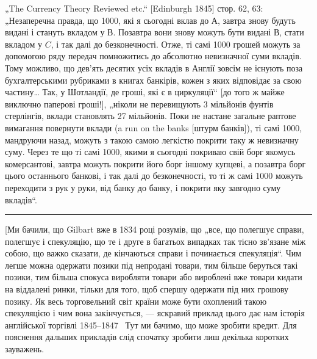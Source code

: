 „The Currency Theory Reviewed etc.“ [Edinburgh 1845] стор. 62, 63: „Незаперечна правда, що 1000, які я сьогодні вклав до $А$, завтра
знову будуть видані і стануть вкладом у $В$. Позавтра вони знову можуть бути
видані $В$, стати вкладом у $C$, і так далі до безконечності. Отже, ті самі
1000 грошей можуть за допомогою ряду передач помножитись до абсолютно невизначної
суми вкладів. Тому можливо, що дев’ять десятих усіх вкладів в Англії зовсім не існують поза
бухгалтерськими рубриками
в книгах банкірів, кожен з яких відповідає за свою частину\dots{} Так, у Шотландії, де гроші, які є в
циркуляції“ [до того ж майже виключно паперові гроші!],
„ніколи не перевищують 3 мільйонів фунтів стерлінгів, вклади становлять 27 мільйонів.
Поки не настане загальне раптове вимагання повернути вклади (a run
on the banks [штурм банків]), ті самі 1000, мандруючи
назад, можуть з такою самою легкістю покрити таку ж невизначну суму.
Через те що ті самі 1000, якими я сьогодні покриваю свій
борг якомусь комерсантові, завтра можуть покрити його борг іншому купцеві,
а позавтра борг цього останнього банкові, і так далі до безконечності, то ті ж
самі 1000 можуть переходити з рук у руки, від банку до
банку, і покрити яку завгодно суму вкладів“.

\pfbreak{}

[Ми бачили, що Gilbart вже в 1834 році розумів, що „все,
що полегшує справи, полегшує і спекуляцію, що те і друге
в багатьох випадках так тісно зв’язане між собою, що важко
сказати, де кінчаються справи і починається спекуляція“. Чим
легше можна одержати позики під непродані товари, тим більше
беруться такі позики, тим більша спокуса виробляти товари або
вироблені вже товари кидати на віддалені ринки, тільки для того,
щоб спершу одержати під них грошову позику. Як весь торговельний світ країни може бути охоплений
такою спекуляцією
і чим вона закінчується, — яскравий приклад цього дає нам історія
англійської торгівлі 1845--1847~ Тут ми бачимо, що може зробити кредит. Для пояснення дальших
прикладів слід спочатку
зробити лиш декілька коротких зауважень.


